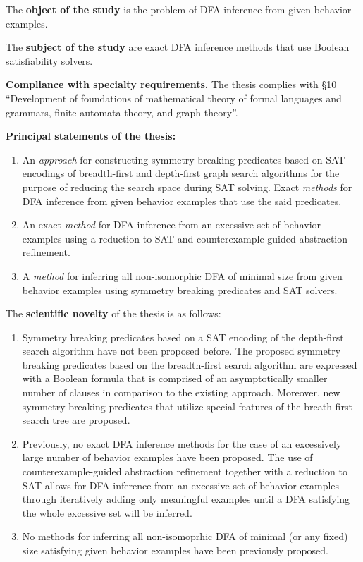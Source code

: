 The \textbf{object of the study} is the problem of DFA inference from given behavior examples.

The \textbf{subject of the study} are exact DFA inference methods that use Boolean satisfiability solvers.

\textbf{Compliance with specialty requirements.} The thesis complies with \S 10 
``Development of foundations of mathematical theory of formal languages and grammars, finite automata theory, and graph theory''.

\textbf{Principal statements of the thesis:}
\begin{enumerate}
  \item An \emph{approach} for constructing symmetry breaking predicates based on SAT encodings of breadth-first and depth-first graph search algorithms for the purpose of reducing the search space during SAT solving.
  Exact \emph{methods} for DFA inference from given behavior examples that use the said predicates.
  
  \item An exact \emph{method} for DFA inference from an excessive set of behavior examples using a reduction to SAT and counterexample-guided abstraction refinement.
  
  \item A \emph{method} for inferring all non-isomorphic DFA of minimal size from given behavior examples using symmetry breaking predicates and SAT solvers.
\end{enumerate}

The \textbf{scientific novelty} of the thesis is as follows:
\begin{enumerate}
  \item Symmetry breaking predicates based on a SAT encoding of the depth-first search algorithm have not been proposed before.
  The proposed symmetry breaking predicates based on the breadth-first search algorithm are expressed with a Boolean formula that is comprised of an asymptotically smaller number of clauses in comparison to the existing approach. 
  Moreover, new symmetry breaking predicates that utilize special features of the breath-first search tree are proposed.

  \item Previously, no exact DFA inference methods for the case of an excessively large number of behavior examples have been proposed.
  The use of counterexample-guided abstraction refinement together with a reduction to SAT allows for DFA inference from an excessive set of behavior examples through
  iteratively adding only meaningful examples until a DFA satisfying the whole excessive set will be inferred.

  \item No methods for inferring all non-isomoprhic DFA of minimal (or any fixed) size satisfying given behavior examples have been previously proposed.
\end{enumerate}

